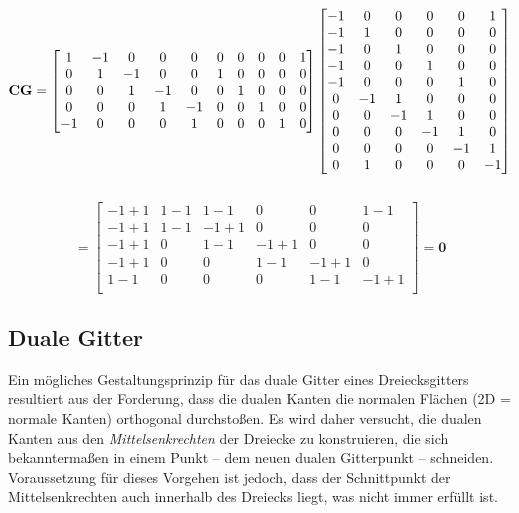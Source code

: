 \documentclass[Protokollheft.tex]{subfiles}
\begin{document}
$$ \curlfit\gradfit = \begin{bmatrix}
1 & -1 & 0 & 0 & 0 & 0 & 0 & 0 & 0 & 1\\
0 & 1 & -1 & 0 & 0 & 1 & 0 & 0 & 0 & 0\\
0 & 0 & 1 & -1 & 0 & 0 & 1 & 0 & 0 & 0\\
0 & 0 & 0 & 1 & -1 & 0 & 0 & 1 & 0 & 0\\
-1 & 0 & 0 & 0 & 1 & 0 & 0 & 0 & 1 & 0 
\end{bmatrix}
 \begin{bmatrix}
 -1 & 0 & 0 & 0 & 0 & 1\\
 -1 & 1 & 0 & 0 & 0 & 0\\
 -1 & 0 & 1 & 0 & 0 & 0\\
 -1 & 0 & 0 & 1 & 0 & 0\\
 -1 & 0 & 0 & 0 & 1 & 0\\
 0 & -1 & 1 & 0 & 0 & 0\\
 0 & 0 & -1 & 1 & 0 & 0\\
 0 & 0 & 0 & -1 & 1 & 0\\
 0 & 0 & 0 & 0 & -1 & 1\\
 0 & 1 & 0 & 0 & 0 & -1\\
 
 \end{bmatrix}$$\\
$$ =\begin{bmatrix}
 -1+1 & 1-1 & 1-1 & 0 & 0 & 1-1 \\
 -1+1 & 1-1 &-1+1 & 0 & 0 & 0\\
 -1+1 & 0 & 1-1 & -1+1 & 0 & 0\\
 -1+1 & 0 & 0 & 1-1 & -1+1 & 0\\
  1-1 & 0 & 0 & 0 & 1-1 &-1+1\\
 \end{bmatrix} = \textbf{0}$$
 

%
    {\subsection{Duale Gitter}}
    Ein mögliches Gestaltungsprinzip für das duale Gitter eines
    Dreiecksgitters resultiert aus der Forderung, dass die dualen
    Kanten die normalen Flächen (2D = normale Kanten) orthogonal
    durchstoßen. Es wird daher versucht, die dualen Kanten aus den
    \emph{Mittelsenkrechten} der Dreiecke zu konstruieren, die sich
    bekanntermaßen in einem Punkt -- dem neuen dualen Gitterpunkt --
    schneiden. Voraussetzung für dieses Vorgehen ist jedoch, dass
    der Schnittpunkt der Mittelsenkrechten auch innerhalb des Dreiecks
    liegt, was nicht immer erfüllt ist.\\
\end{document}
